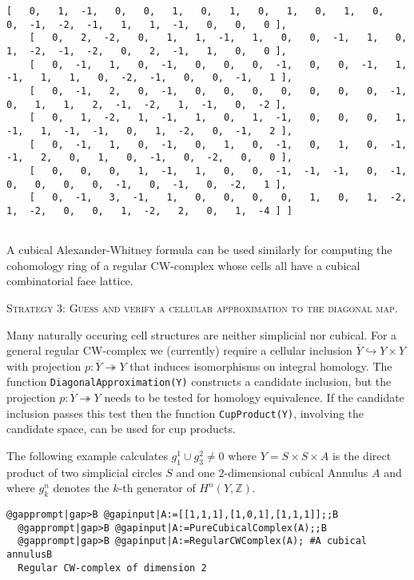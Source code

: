 \documentclass[a4paper,11pt]{report}
\begin{document}
{{\begin{Verbatim}[commandchars=!@|,fontsize=\small,frame=single,label=Example]
    [   0,   1,  -1,   0,   0,   1,   0,   1,   0,   1,   0,   1,   0,   0,  -1,  -2,  -1,   1,   1,  -1,   0,   0,   0 ],
    [   0,   2,  -2,   0,   1,   1,  -1,   1,   0,   0,  -1,   1,   0,   1,  -2,  -1,  -2,   0,   2,  -1,   1,   0,   0 ],
    [   0,  -1,   1,   0,  -1,   0,   0,   0,  -1,   0,   0,  -1,   1,  -1,   1,   1,   0,  -2,  -1,   0,   0,  -1,   1 ],
    [   0,  -1,   2,   0,  -1,   0,   0,   0,   0,   0,   0,   0,  -1,   0,   1,   1,   2,  -1,  -2,   1,  -1,   0,  -2 ],
    [   0,   1,  -2,   1,  -1,   1,   0,   1,  -1,   0,   0,   0,   1,  -1,   1,  -1,  -1,   0,   1,  -2,   0,  -1,   2 ],
    [   0,  -1,   1,   0,  -1,   0,   1,   0,  -1,   0,   1,   0,  -1,  -1,   2,   0,   1,   0,  -1,   0,  -2,   0,   0 ],
    [   0,   0,   0,   1,  -1,   1,   0,   0,  -1,  -1,  -1,   0,  -1,   0,   0,   0,   0,  -1,   0,  -1,   0,  -2,   1 ],
    [   0,  -1,   3,  -1,   1,   0,   0,   0,   0,   1,   0,   1,  -2,   1,  -2,   0,   0,   1,  -2,   2,   0,   1,  -4 ] ]
  
\end{Verbatim}
 A cubical Alexander-Whitney formula can be used similarly for computing the
cohomology ring of a regular CW-complex whose cells all have a cubical
combinatorial face lattice. 

\textsc{Strategy 3: Guess and verify a cellular approximation to the diagonal map.} 

Many naturally occuring cell structures are neither simplicial nor cubical.
For a general regular CW-complex we (currently) require a cellular inclusion $\overline Y \hookrightarrow Y\times Y$ with projection $p\colon \overline Y \twoheadrightarrow Y$ that induces isomorphisms on integral homology. The function \texttt{DiagonalApproximation(Y)} constructs a candidate inclusion, but the projection $p\colon \overline Y \twoheadrightarrow Y$ needs to be tested for homology equivalence. If the candidate inclusion passes
this test then the function \texttt{CupProduct(Y)}, involving the candidate space, can be used for cup products. 

The following example calculates $g_1^1 \cup g_3^2 \ne 0$ where $Y=S\times S\times A$ is the direct product of two simplicial circles $S$ and one $2$-dimensional cubical Annulus $A$ and where $g_k^n$ denotes the $k$-th generator of $H^n(Y,\mathbb Z)$. 
\begin{Verbatim}[commandchars=@|B,fontsize=\small,frame=single,label=Example]
  @gapprompt|gap>B @gapinput|A:=[[1,1,1],[1,0,1],[1,1,1]];;B
  @gapprompt|gap>B @gapinput|A:=PureCubicalComplex(A);;B
  @gapprompt|gap>B @gapinput|A:=RegularCWComplex(A); #A cubical annulusB
  Regular CW-complex of dimension 2
  

\end{Verbatim}}}
\end{document}
